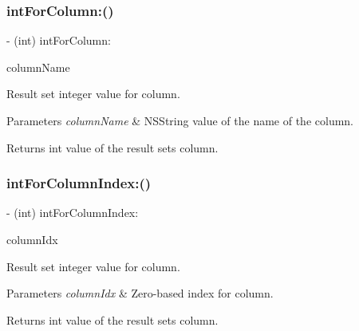 \subsubsection{\texorpdfstring{int\+For\+Column\+:()}{intForColumn:()}}
{\footnotesize\ttfamily -\/ (int) int\+For\+Column\+: \begin{DoxyParamCaption}\item[{(N\+S\+String$\ast$)}]{column\+Name }\end{DoxyParamCaption}}

Result set integer value for column.


\begin{DoxyParams}{Parameters}
{\em column\+Name} & {\ttfamily N\+S\+String} value of the name of the column.\\
\hline
\end{DoxyParams}
\begin{DoxyReturn}{Returns}
{\ttfamily int} value of the result set\textquotesingle{}s column. 
\end{DoxyReturn}
\mbox{\label{interface_o_p_t_l_y_f_m_d_b_result_set_a891494b15f1c7e1951275501891669f7}} 
\subsubsection{\texorpdfstring{int\+For\+Column\+Index\+:()}{intForColumnIndex:()}}
{\footnotesize\ttfamily -\/ (int) int\+For\+Column\+Index\+: \begin{DoxyParamCaption}\item[{(int)}]{column\+Idx }\end{DoxyParamCaption}}

Result set integer value for column.


\begin{DoxyParams}{Parameters}
{\em column\+Idx} & Zero-\/based index for column.\\
\hline
\end{DoxyParams}
\begin{DoxyReturn}{Returns}
{\ttfamily int} value of the result set\textquotesingle{}s column. 
\end{DoxyReturn}
\mbox{\label{interface_o_p_t_l_y_f_m_d_b_result_set_a2a8f33f21659c2f4594c4a8328baae55}} 
